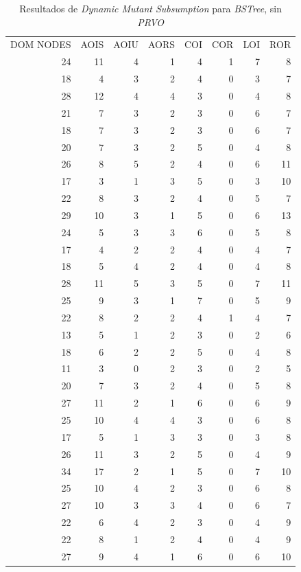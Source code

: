 \begin{table}[]
	\caption[\emph{Dynamic Mutant Subsumption} \emph{BSTree}, sin \emph{PRVO}]{Resultados de \emph{Dynamic Mutant Subsumption} para \emph{BSTree}, sin \emph{PRVO}}
	\label{tables.results.subsumption.bstree.noprvo}
	\centering
	\scriptsize
	\def\arraystretch{0.95}
	\setlength\tabcolsep{0.5mm}
	\begin{tabular}{rrrrrrrr}
	DOM NODES & AOIS & AOIU & AORS & COI & COR & LOI & ROR \\
	24 & 11 & 4 & 1 & 4 & 1 & 7 & 8 \\
	18 & 4 & 3 & 2 & 4 & 0 & 3 & 7 \\
	28 & 12 & 4 & 4 & 3 & 0 & 4 & 8 \\
	21 & 7 & 3 & 2 & 3 & 0 & 6 & 7 \\
	18 & 7 & 3 & 2 & 3 & 0 & 6 & 7 \\
	20 & 7 & 3 & 2 & 5 & 0 & 4 & 8 \\
	26 & 8 & 5 & 2 & 4 & 0 & 6 & 11 \\
	17 & 3 & 1 & 3 & 5 & 0 & 3 & 10 \\
	22 & 8 & 3 & 2 & 4 & 0 & 5 & 7 \\
	29 & 10 & 3 & 1 & 5 & 0 & 6 & 13 \\
	24 & 5 & 3 & 3 & 6 & 0 & 5 & 8 \\
	17 & 4 & 2 & 2 & 4 & 0 & 4 & 7 \\
	18 & 5 & 4 & 2 & 4 & 0 & 4 & 8 \\
	28 & 11 & 5 & 3 & 5 & 0 & 7 & 11 \\
	25 & 9 & 3 & 1 & 7 & 0 & 5 & 9 \\
	22 & 8 & 2 & 2 & 4 & 1 & 4 & 7 \\
	13 & 5 & 1 & 2 & 3 & 0 & 2 & 6 \\
	18 & 6 & 2 & 2 & 5 & 0 & 4 & 8 \\
	11 & 3 & 0 & 2 & 3 & 0 & 2 & 5 \\
	20 & 7 & 3 & 2 & 4 & 0 & 5 & 8 \\
	27 & 11 & 2 & 1 & 6 & 0 & 6 & 9 \\
	25 & 10 & 4 & 4 & 3 & 0 & 6 & 8 \\
	17 & 5 & 1 & 3 & 3 & 0 & 3 & 8 \\
	26 & 11 & 3 & 2 & 5 & 0 & 4 & 9 \\
	34 & 17 & 2 & 1 & 5 & 0 & 7 & 10 \\
	25 & 10 & 4 & 2 & 3 & 0 & 6 & 8 \\
	27 & 10 & 3 & 3 & 4 & 0 & 6 & 7 \\
	22 & 6 & 4 & 2 & 3 & 0 & 4 & 9 \\
	22 & 8 & 1 & 2 & 4 & 0 & 4 & 9 \\
	27 & 9 & 4 & 1 & 6 & 0 & 6 & 10
	\end{tabular}
\end{table}

